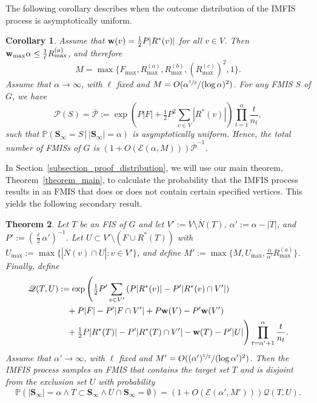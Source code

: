 \documentclass{article}
\theoremstyle{plain}
\newtheorem{theorem}{Theorem}[section]
\theoremstyle{remark}
\theoremstyle{plain}
\newtheorem{corollary}[theorem]{Corollary}
\numberwithin{equation}{section}
\renewcommand{\b}{{\bf{w}}}
\begin{document}
	The following corollary describes when the outcome distribution of the IMFIS process is asymptotically uniform.
	
	\begin{corollary}\label{corollary_uniform}
		Assume that $\b(v)=\frac12P|R^*(v)|$ for all $v\in V$. Then $\b_{\max}\alpha\leq\frac1{\ell}R_{\max}^{(a)}$, and therefore $$M=\max\{F_{\max},R_{\max}^{(a)},R_{\max}^{(b)},(R_{\max}^{(c)})^2,1\}.$$ Assume that $\alpha\to\infty$, with $\ell$ fixed and $M=O(\alpha^{\sfrac12}/(\log\alpha)^2)$. For any FMIS $S$ of $G$, we have $$\mathscr{P}(S)=\overline{\mathscr{P}}:=\exp\left(P|F|+\tfrac12P^2\sum_{v\in V}|R^*(v)|\right)\prod_{t=1}^{\alpha}\frac{t}{n_t},$$ such that $\mathbb{P}(\boldsymbol{S}_{\infty}=S\,|\,|\boldsymbol{S}_{\infty}|=\alpha)$ is asymptotically uniform. Hence, the total number of FMISs of $G$ is $(1+O(\mathscr{E}(\alpha,M)))\overline{\mathscr{P}}^{-1}$.
	\end{corollary}
	
	In Section~\ref{subsection_proof_distribution}, we will use our main theorem, Theorem~\ref{theorem_main}, to calculate the probability that the IMFIS process results in an FMIS that does or does not contain certain specified vertices. This yields the following secondary result.
	
	\begin{theorem}\label{theorem_space}
		Let $T$ be an FIS of $G$ and let $V':=V\setminus\overline{N}(T)$, $\alpha':=\alpha-|T|$, and $P':=(\tfrac{\ell}{2}\alpha')^{-1}$. Let $U\subset V'\setminus(F\cup R^*(T))$ with $U_{\max}:=\max\{|\overline{N}(v)\cap U|:v\in V'\}$, and define $M':=\max\{M,U_{\max},\tfrac{\alpha}{\alpha'}R_{\max}^{(a)}\}$. Finally, define
		\begin{align}
			\mathscr{Q}(T,U)&:=\exp\Bigg(\tfrac12P'\sum_{v\in V'}\left(P|R^*(v)|-P'|R^*(v)\cap V'|\right)\Bigg.
			\\&\quad+P|F|-P'|F\cap V'|+P\b(V)-P'\b(V')
			\\&\quad\Bigg.+\tfrac12P|R^*(T)|-P'|R^*(T)\cap V'|-\b(T)-P'|U|\Bigg)\prod_{t=\alpha'+1}^{\alpha}\frac{t}{n_t}.
		\end{align}
		Assume that $\alpha'\to\infty$, with $\ell$ fixed and $M'=O((\alpha')^{\sfrac12}/(\log\alpha')^2)$. Then the IMFIS process samples an FMIS that contains the \emph{target set} $T$ and is disjoint from the \emph{exclusion set} $U$ with probability $$\mathbb{P}(|\boldsymbol{S}_{\infty}|=\alpha\wedge T\subset\boldsymbol{S}_{\infty}\wedge U\cap\boldsymbol{S}_{\infty}=\emptyset)=(1+O(\mathscr{E}(\alpha',M')))\mathscr{Q}(T,U).$$
	\end{theorem}
	
\end{document}
